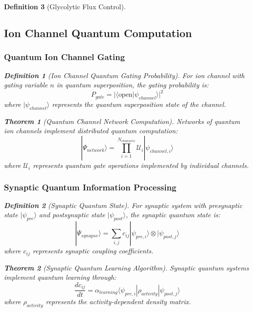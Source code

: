 \documentclass[12pt,a4paper]{article}
\newtheorem{theorem}{Theorem}
\newtheorem{definition}{Definition}
\begin{document}
\begin{definition}[Glycolytic Flux Control]
\subsection{Ion Channel Quantum Computation}

\subsubsection{Quantum Ion Channel Gating}

\begin{definition}[Ion Channel Quantum Gating Probability]
For ion channel with gating variable $n$ in quantum superposition, the gating probability is:
\begin{equation}
P_{gate} = |\langle \text{open} | \psi_{channel} \rangle|^2
\end{equation}
where $|\psi_{channel}\rangle$ represents the quantum superposition state of the channel.
\end{definition}

\begin{theorem}[Quantum Channel Network Computation]
Networks of quantum ion channels implement distributed quantum computation:
\begin{equation}
|\Psi_{network}\rangle = \prod_{i=1}^{N_{channels}} \mathcal{U}_i |\psi_{channel,i}\rangle
\end{equation}
where $\mathcal{U}_i$ represents quantum gate operations implemented by individual channels.
\end{theorem}

\subsubsection{Synaptic Quantum Information Processing}

\begin{definition}[Synaptic Quantum State]
For synaptic system with presynaptic state $|\psi_{pre}\rangle$ and postsynaptic state $|\psi_{post}\rangle$, the synaptic quantum state is:
\begin{equation}
|\Psi_{synapse}\rangle = \sum_{i,j} c_{ij} |\psi_{pre,i}\rangle \otimes |\psi_{post,j}\rangle
\end{equation}
where $c_{ij}$ represents synaptic coupling coefficients.
\end{definition}

\begin{theorem}[Synaptic Quantum Learning Algorithm]
Synaptic quantum systems implement quantum learning through:
\begin{equation}
\frac{dc_{ij}}{dt} = \alpha_{learning} \langle \psi_{pre,i} | \rho_{activity} | \psi_{post,j} \rangle
\end{equation}
where $\rho_{activity}$ represents the activity-dependent density matrix.
\end{theorem}


\end{definition}
\end{document}
